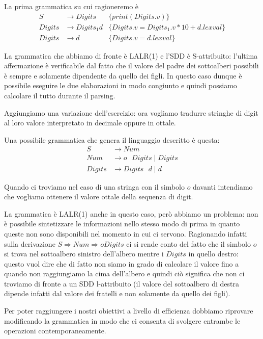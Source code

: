 \documentclass[class=book, crop=false, oneside, 12pt]{standalone}
\begin{document}
La prima grammatica su cui ragioneremo è
\begin{align*}
    S &\to Digits	&\{print(Digits.v)\} \\
    Digits &\to Digits_1 d	&\{Digits.v = Digits_1.v * 10 + d.lexval\} \\
    Digits &\to d	&\{Digits.v = d.lexval\}
\end{align*}

La grammatica che abbiamo di fronte è LALR(1) e l'SDD è S-attribuito: l'ultima affermazione è verificabile dal fatto che il valore del padre dei sottoalberi possibili è sempre e solamente dipendente da quello dei figli. In questo caso dunque è possibile eseguire le due elaborazioni in modo congiunto e quindi possiamo calcolare il tutto durante il parsing. 

Aggiungiamo una variazione dell'esercizio: ora vogliamo tradurre stringhe di digit al loro valore interpretato in decimale oppure in ottale.

Una possibile grammatica che genera il linguaggio descritto è questa:
\begin{align*}
    S &\to Num \\
    Num &\to o \textrm{ } Digits \mid Digits \\
    Digits &\to Digits \textrm{ } d \mid d
\end{align*}

Quando ci troviamo nel caso di una stringa con il simbolo \(o\) davanti intendiamo che vogliamo ottenere il valore ottale della sequenza di digit. 

La grammatica è LALR(1) anche in questo caso, però abbiamo un problema: non è possibile sintetizzare le informazioni nello stesso modo di prima in quanto queste non sono disponibili nel momento in cui ci servono. Ragionando infatti sulla derivazione \(S \Rightarrow Num \Rightarrow o Digits\) ci si rende conto del fatto che il simbolo \(o\) si trova nel sottoalbero sinistro dell'albero mentre i \(Digits\) in quello destro: questo vuol dire che di fatto non siamo in grado di calcolare il valore fino a quando non raggiungiamo la cima dell'albero e quindi ciò significa che non ci troviamo di fronte a un SDD l-attribuito (il valore del sottoalbero di destra dipende infatti dal valore dei fratelli e non solamente da quello dei figli).

Per poter raggiungere i nostri obiettivi a livello di efficienza dobbiamo riprovare modificando la grammatica in modo che ci consenta di svolgere entrambe le operazioni contemporaneamente.
\end{document}
